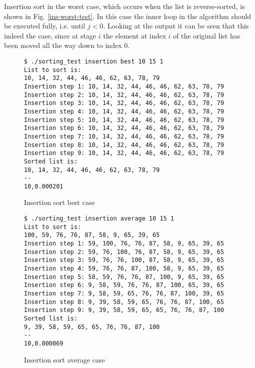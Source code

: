 \documentclass{article}
\begin{document}
Insertion sort in the worst case, which occurs when the list is reverse-sorted, is shown in Fig. \ref{ins-worst-test}. In this case the inner loop in the algorithm should be executed fully, i.e. until $j < 0$. Looking at the output it can be seen that this indeed the case, since at stage $i$ the element at index $i$ of the original list has been moved all the way down to index 0.

\begin{figure}[H]
	\centering
	\begin{BVerbatim}
$ ./sorting_test insertion best 10 15 1
List to sort is:
10, 14, 32, 44, 46, 46, 62, 63, 78, 79
Insertion step 1: 10, 14, 32, 44, 46, 46, 62, 63, 78, 79
Insertion step 2: 10, 14, 32, 44, 46, 46, 62, 63, 78, 79
Insertion step 3: 10, 14, 32, 44, 46, 46, 62, 63, 78, 79
Insertion step 4: 10, 14, 32, 44, 46, 46, 62, 63, 78, 79
Insertion step 5: 10, 14, 32, 44, 46, 46, 62, 63, 78, 79
Insertion step 6: 10, 14, 32, 44, 46, 46, 62, 63, 78, 79
Insertion step 7: 10, 14, 32, 44, 46, 46, 62, 63, 78, 79
Insertion step 8: 10, 14, 32, 44, 46, 46, 62, 63, 78, 79
Insertion step 9: 10, 14, 32, 44, 46, 46, 62, 63, 78, 79
Sorted list is:
10, 14, 32, 44, 46, 46, 62, 63, 78, 79
--
10,0.000201
	\end{BVerbatim}
	\caption{Insertion sort best case}
	\label{ins-best-test}
\end{figure}

\begin{figure}[H]
	\centering
	\begin{BVerbatim}
$ ./sorting_test insertion average 10 15 1
List to sort is:
100, 59, 76, 76, 87, 58, 9, 65, 39, 65
Insertion step 1: 59, 100, 76, 76, 87, 58, 9, 65, 39, 65
Insertion step 2: 59, 76, 100, 76, 87, 58, 9, 65, 39, 65
Insertion step 3: 59, 76, 76, 100, 87, 58, 9, 65, 39, 65
Insertion step 4: 59, 76, 76, 87, 100, 58, 9, 65, 39, 65
Insertion step 5: 58, 59, 76, 76, 87, 100, 9, 65, 39, 65
Insertion step 6: 9, 58, 59, 76, 76, 87, 100, 65, 39, 65
Insertion step 7: 9, 58, 59, 65, 76, 76, 87, 100, 39, 65
Insertion step 8: 9, 39, 58, 59, 65, 76, 76, 87, 100, 65
Insertion step 9: 9, 39, 58, 59, 65, 65, 76, 76, 87, 100
Sorted list is:
9, 39, 58, 59, 65, 65, 76, 76, 87, 100
--
10,0.000069
	\end{BVerbatim}
	\caption{Insertion sort average case}
	\label{ins-avg-test}
\end{figure}
\end{document}
